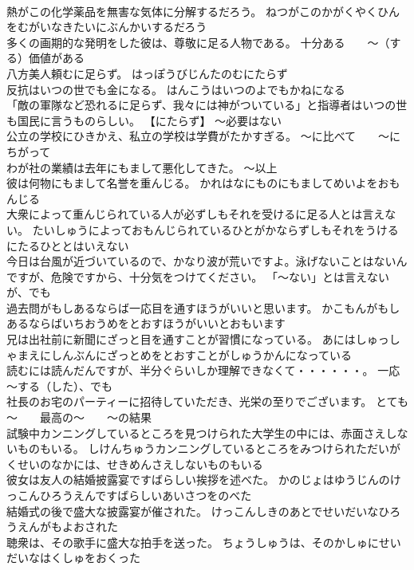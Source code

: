 \documentclass[8pt]{extreport}
\begin{document}
\begin{CJK}{UTF8}{min}
\\	熱がこの化学薬品を無害な気体に分解するだろう。	ねつがこのかがくやくひんをむがいなきたいにぶんかいするだろう 
\\	多くの画期的な発明をした彼は、尊敬に足る人物である。	十分ある　　～（する）価値がある
\\	八方美人頼むに足らず。	はっぽうびじんたのむにたらず 
\\	反抗はいつの世でも金になる。	はんこうはいつのよでもかねになる 
\\	「敵の軍隊など恐れるに足らず、我々には神がついている」と指導者はいつの世も国民に言うものらしい。	【にたらず】 ～必要はない
\\	公立の学校にひきかえ、私立の学校は学費がたかすぎる。	～に比べて　　～にちがって
\\	わが社の業績は去年にもまして悪化してきた。	～以上
\\	彼は何物にもまして名誉を重んじる。	かれはなにものにもましてめいよをおもんじる 
\\	大衆によって重んじられている人が必ずしもそれを受けるに足る人とは言えない。	たいしゅうによっておもんじられているひとがかならずしもそれをうけるにたるひととはいえない 
\\	今日は台風が近づいているので、かなり波が荒いですよ。泳げないことはないんですが、危険ですから、十分気をつけてください。	「～ない」とは言えないが、でも
\\	過去問がもしあるならば一応目を通すほうがいいと思います。	かこもんがもしあるならばいちおうめをとおすほうがいいとおもいます 
\\	兄は出社前に新聞にざっと目を通すことが習慣になっている。	あにはしゅっしゃまえにしんぶんにざっとめをとおすことがしゅうかんになっている 
\\	読むには読んだんですが、半分ぐらいしか理解できなくて・・・・・・。	一応～する（した）、でも
\\	社長のお宅のパーティーに招待していただき、光栄の至りでございます。	とても～　　最高の～　　～の結果
\\	試験中カンニングしているところを見つけられた大学生の中には、赤面さえしないものもいる。	しけんちゅうカンニングしているところをみつけられただいがくせいのなかには、せきめんさえしないものもいる 
\\	彼女は友人の結婚披露宴ですばらしい挨拶を述べた。	かのじょはゆうじんのけっこんひろうえんですばらしいあいさつをのべた 
\\	結婚式の後で盛大な披露宴が催された。	けっこんしきのあとでせいだいなひろうえんがもよおされた 
\\	聴衆は、その歌手に盛大な拍手を送った。	ちょうしゅうは、そのかしゅにせいだいなはくしゅをおくった 

\end{CJK}
\end{document}
